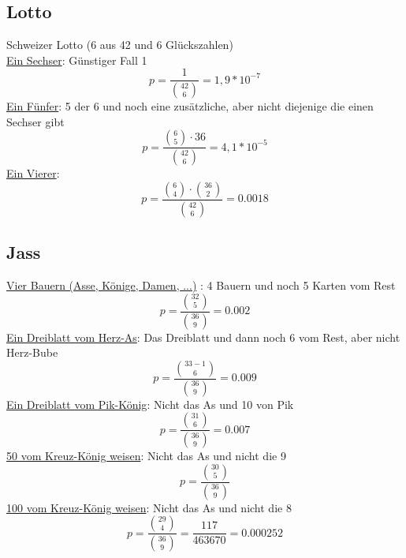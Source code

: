 \documentclass{article}
\begin{document}
\subsection{Lotto}
Schweizer Lotto (6 aus 42 und 6 Glückszahlen)\\
\underline{Ein Sechser}: Günstiger Fall 1
\begin{equation}
p = \frac{1}{\binom{42}{6}} = 1,9 * 10^{-7}
\end{equation}
\underline{Ein Fünfer}: 5 der 6 und noch eine zusätzliche, aber nicht diejenige die einen Sechser gibt
\begin{equation}
p = \frac{\binom{6}{5} \cdot 36}{\binom{42}{6}} = 4,1 * 10^{-5}
\end{equation}
\underline{Ein Vierer}:
\begin{equation}
p = \frac{\binom{6}{4} \cdot \binom{36}{2}}{\binom{42}{6}} = 0.0018
\end{equation}

\subsection{Jass}
\underline{Vier Bauern (Asse, Könige, Damen, ...)} : 4 Bauern und noch 5 Karten vom Rest
\begin{equation}
p = \frac{\binom{32}{5}}{\binom{36}{9}} = 0.002
\end{equation}
\underline{Ein Dreiblatt vom Herz-As}: Das Dreiblatt und dann noch 6 vom Rest, aber nicht Herz-Bube
\begin{equation}
p = \frac{\binom{33-1}{6}}{\binom{36}{9}} = 0.009
\end{equation}
\underline{Ein Dreiblatt vom Pik-König}: Nicht das As und 10 von Pik	
\begin{equation}
p = \frac{\binom{31}{6}}{\binom{36}{9}} = 0.007
\end{equation}
\underline{50 vom Kreuz-König weisen}: Nicht das As und nicht die 9
\begin{equation}
p = \frac{\binom{30}{5}}{\binom{36}{9}}
\end{equation}
\underline{100 vom Kreuz-König weisen}: Nicht das As und nicht die 8
\begin{equation}
p = \frac{\binom{29}{4}}{\binom{36}{9}} = \frac{117}{463670} = 0.000252
\end{equation}
\end{document}
